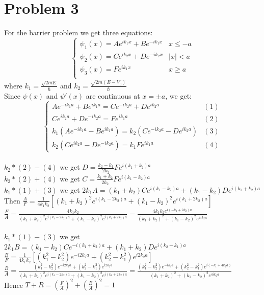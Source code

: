 \documentclass[a4paper]{article}
\begin{document}
\section{Problem 3}
For the barrier problem we get three equations:
\\ \[\left\{\begin{array}{ll}
    \psi_1(x)=Ae^{ik_1x}+Be^{-ik_1x}&x\leq -a\\
    \psi_2(x)=Ce^{ik_2x}+De^{-ik_2x}&|x|<a\\ 
    \psi_3(x)=Fe^{ik_1x}&x\geq a\\  
    \end{array}\right.\]
where $k_1=\frac{\sqrt{2mE}}{\hbar}$ and $k_2=\frac{\sqrt{2m(E-V_0)}}{\hbar}$
\\Since $\psi(x)$ and $\psi'(x)$ are continuous at $x=\pm a$, we get:
\\ \[\left\{\begin{array}{ll}
    Ae^{-ik_1a}+Be^{ik_1a}=Ce^{-ik_2a}+De^{ik_2a}&(1)\\
    Ce^{ik_2a}+De^{-ik_2a}=Fe^{ik_1a}&(2)\\
    k_1(Ae^{-ik_1a}-Be^{ik_1a})=k_2(Ce^{-ik_2a}-De^{ik_2a})&(3)\\
    k_2(Ce^{ik_2a}-De^{-ik_2a})=k_1Fe^{ik_1a}&(4)
    \end{array}\right.\]
\\$k_2*(2)-(4)$ we get $D=\frac{k_2-k_1}{2k_2}Fe^{i(k_1+k_2)a}$
\\$k_2*(2)+(4)$ we get $C=\frac{k_1+k_2}{2k_2}Fe^{i(k_1-k_2)a}$
\\$k_1*(1)+(3)$ we get $2k_1A=(k_1+k_2)Ce^{i(k_1-k_2)a}+(k_1-k_2)De^{i(k_1+k_2)a}$
\\Then $\frac{A}{F}=\frac{1}{4k_1k_2}[(k_1+k_2)^2e^{i(k_1-2k_2)a}+(k_1-k_2)^2e^{i(k_1+2k_2)a}]$
\\$\frac{F}{A}=\frac{4k_1k_2}{(k_1+k_2)^2e^{i(k_1-2k_2)a}+(k_1-k_2)^2e^{i(k_1+2k_2)a}}=\frac{4k_1k_2e^{i(-k_1+2k_2)a}}{(k_1+k_2)^2+(k_1-k_2)^2e^{4ik_2a}}$
\\\\$k_1*(1)-(3)$ we get $2k_1B=(k_1-k_2)Ce^{-i(k_1+k_2)a}+(k_1+k_2)De^{i(k_2-k_1)a}$
\\$\frac{B}{F}=\frac{1}{4k_1k_2}[(k_1^2-k_2^2)e^{-i2k_2a}+(k_2^2-k_1^2)e^{i2k_2a}]$
\\$\frac{B}{A}=\frac{(k_1^2-k_2^2)e^{-i2k_2a}+(k_2^2-k_1^2)e^{i2k_2a}}{(k_1+k_2)^2e^{i(k_1-2k_2)a}+(k_1-k_2)^2e^{i(k_1+2k_2)a}}=\frac{(k_1^2-k_2^2)e^{-ik_1a}+(k_2^2-k_1^2)e^{i(-k_1+4k_2a)}}{(k_1+k_2)^2+(k_1-k_2)^2e^{4ik_2a}}$
\\Hence $T+R=(\frac{F}{A})^2+(\frac{B}{A})^2=1$
\end{document}
